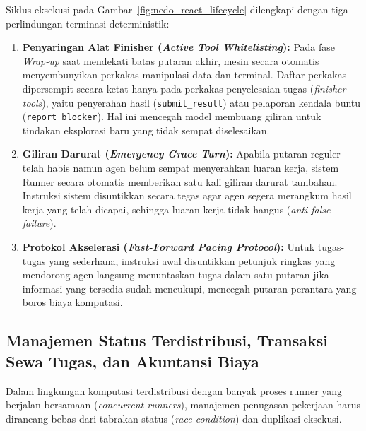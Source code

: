 Siklus eksekusi pada Gambar~\ref{fig:nedo_react_lifecycle} dilengkapi dengan tiga perlindungan terminasi deterministik:
\begin{enumerate}[label=\arabic*.]
  \item \textbf{Penyaringan Alat Finisher (\textit{Active Tool Whitelisting}):} Pada fase \textit{Wrap-up} saat mendekati batas putaran akhir, mesin secara otomatis menyembunyikan perkakas manipulasi data dan terminal. Daftar perkakas dipersempit secara ketat hanya pada perkakas penyelesaian tugas (\textit{finisher tools}), yaitu penyerahan hasil (\texttt{submit\_result}) atau pelaporan kendala buntu (\texttt{report\_blocker}). Hal ini mencegah model membuang giliran untuk tindakan eksplorasi baru yang tidak sempat diselesaikan.
  \item \textbf{Giliran Darurat (\textit{Emergency Grace Turn}):} Apabila putaran reguler telah habis namun agen belum sempat menyerahkan luaran kerja, sistem Runner secara otomatis memberikan satu kali giliran darurat tambahan. Instruksi sistem disuntikkan secara tegas agar agen segera merangkum hasil kerja yang telah dicapai, sehingga luaran kerja tidak hangus (\textit{anti-false-failure}).
  \item \textbf{Protokol Akselerasi (\textit{Fast-Forward Pacing Protocol}):} Untuk tugas-tugas yang sederhana, instruksi awal disuntikkan petunjuk ringkas yang mendorong agen langsung menuntaskan tugas dalam satu putaran jika informasi yang tersedia sudah mencukupi, mencegah putaran perantara yang boros biaya komputasi.
\end{enumerate}

\subsection{Manajemen Status Terdistribusi, Transaksi Sewa Tugas, dan Akuntansi Biaya}

Dalam lingkungan komputasi terdistribusi dengan banyak proses runner yang berjalan bersamaan (\textit{concurrent runners}), manajemen penugasan pekerjaan harus dirancang bebas dari tabrakan status (\textit{race condition}) dan duplikasi eksekusi.

